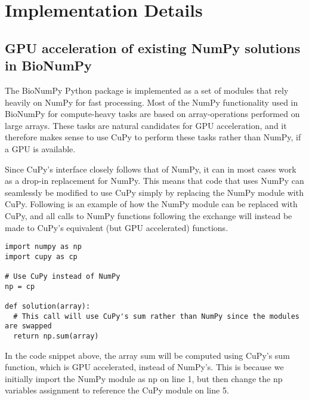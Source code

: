 \section*{Implementation Details}\label{imlementation_details}
\subsection*{GPU acceleration of existing NumPy solutions in BioNumPy}

The BioNumPy Python package is implemented as a set of modules that rely heavily on NumPy for fast processing.
Most of the NumPy functionality used in BioNumPy for compute-heavy tasks are based on array-operations performed on large arrays.
These tasks are natural candidates for GPU acceleration, and it therefore makes sense to use CuPy to perform these tasks rather than NumPy, if a GPU is available.

Since CuPy's interface closely follows that of NumPy, it can in most cases work as a drop-in replacement for NumPy.
This means that code that uses NumPy can seamlessly be modified to use CuPy simply by replacing the NumPy module with CuPy.
Following is an example of how the NumPy module can be replaced with CuPy, and all calls to NumPy functions following the exchange will instead be made to CuPy's equivalent (but GPU accelerated) functions.



\begin{lstlisting}
import numpy as np
import cupy as cp

# Use CuPy instead of NumPy
np = cp

def solution(array):
  # This call will use CuPy's sum rather than NumPy since the modules are swapped
  return np.sum(array) 
\end{lstlisting}

In the code snippet above, the array sum will be computed using CuPy's sum function, which is GPU accelerated, instead of NumPy's.
This is because we initially import the NumPy module as np on line 1, but then change the np variables assignment to reference the CuPy module on line 5.

